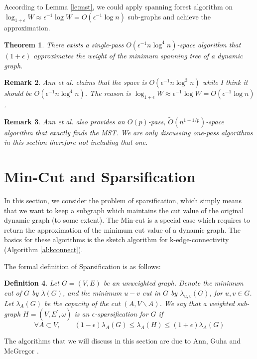 \documentclass[11pt]{article}
\theoremstyle{plain}
\newtheorem{theorem}{Theorem}[section]
\newtheorem{definition}[theorem]{Definition}
\newtheorem{remark}[theorem]{Remark}
\begin{document}
According to Lemma \ref{le:mst}, we 
could apply spanning forest algorithm on $\log_{1+\epsilon}W\approx 
\epsilon^{-1}\log W=O(\epsilon^{-1}\log n)$ sub-graphs and achieve the 
approximation. 

\begin{theorem}
	There exists a single-pass $O(\epsilon^{-1}n\log^4 n)$-space algorithm that 
	$(1+\epsilon)$ approximates the weight of the minimum spanning tree of a 
	dynamic graph. 
\end{theorem}

\begin{remark}
Ann et al. claims that the space is $O(\epsilon^{-1}n\log^3 n)$ while I think it 
should be $O(\epsilon^{-1}n\log^4 n)$. The reason is 
$\log_{1+\epsilon}W\approx 
\epsilon^{-1}\log W=O(\epsilon^{-1}\log n)$.
\end{remark}

\begin{remark}
	Ann et al. \cite{AGM2012-analyzing} also provides an $O(p)$-pass, 
	$\tilde{O}(n^{1+1/p})$-space algorithm that exactly finds the MST. We are 
	only discussing one-pass algorithms in this section therefore not including 
	that one. 
\end{remark}

\section{Min-Cut and Sparsification}

In this section, we consider the problem of sparsification, which simply 
means that we want to keep a subgraph which maintains the cut value of the 
original dynamic graph (to some extent). The Min-cut is a special case which 
requires to return the approximation of the minimum cut value of a dynamic 
graph. The basics for these algorithms is the sketch algorithm for 
k-edge-connectivity (Algorithm \ref{al:kconnect}).

The formal definition of Sparsification is as follows:
\begin{definition}
Let $G=(V,E)$ be an unweighted graph.
Denote the minimum cut of $G$ by $\lambda(G)$, and the minimum $u-v$ 
cut in $G$ by $\lambda_{u,v}(G)$, for $u,v\in G$. Let $\lambda_A(G)$ be the 
capacity of the cut $(A, V\backslash A)$. We say that a weighted sub-graph 
$H=(V,E^{\prime},\omega)$ is an $\epsilon$-sparsification for $G$ if 
\[
\forall A\subset V, \qquad (1-\epsilon)\lambda_A(G)\leq \lambda_A(H)\leq 
(1+\epsilon)\lambda_A(G)
\]
\end{definition}
The algorithms that we will discuss in this section are due to Ann, Guha and 
McGregor  \cite{AGM2012-graph}.
\end{document}
